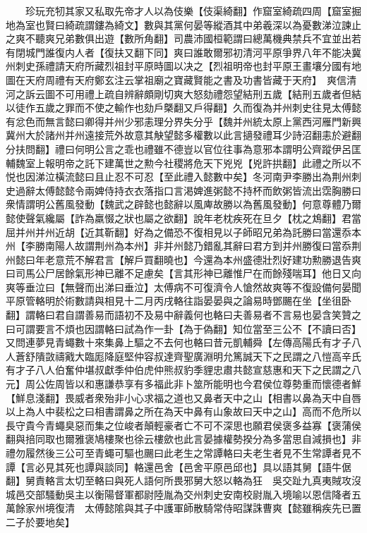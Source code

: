 　　珍玩充牣其家又私取先帝才人以為伎樂【伎渠綺翻】作窟室綺疏四周【窟室掘地為室也賢曰綺疏謂鏤為綺文】數與其黨何晏等縱酒其中弟羲深以為憂數涕泣諫止之爽不聽爽兄弟數俱出遊【數所角翻】司農沛國桓範謂曰總萬機典禁兵不宜並出若有閉城門誰復内人者【復扶又翻下同】爽曰誰敢爾邪初清河平原爭界八年不能决冀州刺史孫禮請天府所藏烈祖封平原時圖以决之【烈祖明帝也封平原王畫壤分國有地圖在天府周禮有天府鄭玄注云掌祖廟之寶藏賢能之書及功書皆藏于天府】　爽信清河之訴云圖不可用禮上疏自辨辭頗剛切爽大怒劾禮怨望結刑五歲【結刑五歲者但結以徒作五歲之罪而不使之輸作也劾戶槩翻又戶得翻】久而復為并州刺史往見太傅懿有忿色而無言懿曰卿得并州少邪恚理分界失分乎【魏并州統太原上黨西河雁門新興冀州大於諸州并州遠接荒外故意其觖望懿多權數以此言擿發禮耳少詩沼翻恚於避翻分扶問翻】禮曰何明公言之乖也禮雖不德豈以官位往事為意邪本謂明公齊蹤伊呂匡輔魏室上報明帝之託下建萬世之勲今社稷將危天下兇兇【兇許拱翻】此禮之所以不悦也因涕泣橫流懿曰且止忍不可忍【至此禮入懿數中矣】冬河南尹李勝出為荆州刺史過辭太傅懿懿令兩婢侍持衣衣落指口言渇婢進粥懿不持杯而飲粥皆流出霑胸勝曰衆情謂明公舊風發動【魏武之辟懿也懿辭以風庳故勝以為舊風發動】何意尊體乃爾懿使聲氣纔屬【詐為羸惙之狀也屬之欲翻】說年老枕疾死在旦夕【枕之鴆翻】君當屈并州并州近胡【近其靳翻】好為之備恐不復相見以子師昭兄弟為託勝曰當還忝本州【李勝南陽人故謂荆州為本州】非并州懿乃錯亂其辭曰君方到并州勝復曰當忝荆州懿曰年老意荒不解君言【解戶買翻曉也】今還為本州盛德壯烈好建功勲勝退告爽曰司馬公尸居餘氣形神已離不足慮矣【言其形神已離惟尸在而餘殘喘耳】他日又向爽等垂泣曰【無聲而出涕曰垂泣】太傅病不可復濟令人愴然故爽等不復設備何晏聞平原管輅明於術數請與相見十二月丙戌輅往詣晏晏與之論易時鄧颺在坐【坐徂卧翻】謂輅曰君自謂善易而語初不及易中辭義何也輅曰夫善易者不言易也晏含笑贊之曰可謂要言不煩也因謂輅曰試為作一卦【為于偽翻】知位當至三公不【不讀曰否】又問連夢見青蠅數十來集鼻上驅之不去何也輅曰昔元凱輔舜【左傳高陽氏有才子八人蒼舒隤敳禱戭大臨厖降庭堅仲容叔達齊聖廣淵明允篤誠天下之民謂之八愷高辛氏有才子八人伯奮仲堪叔獻季仲伯虎仲熊叔豹季貍忠肅共懿宣慈惠和天下之民謂之八元】周公佐周皆以和惠謙恭享有多福此非卜筮所能明也今君侯位尊勢重而懷德者鮮【鮮息淺翻】畏威者衆殆非小心求福之道也又鼻者天中之山【相書以鼻為天中自唇以上為人中裴松之曰相書謂鼻之所在為天中鼻有山象故曰天中之山】高而不危所以長守貴今青蠅臭惡而集之位峻者顛輕豪者亡不可不深思也願君侯褒多益寡【褒蒲侯翻與掊同取也爾雅褒鳩樓聚也徐云樓歛也此言晏據權勢揆分為多當思自減損也】非禮勿履然後三公可至青蠅可驅也颺曰此老生之常譚輅曰夫老生者見不生常譚者見不譚【言必見其死也譚與談同】輅還邑舍【邑舍平原邑邱也】具以語其舅【語牛倨翻】舅責輅言太切至輅曰與死人語何所畏邪舅大怒以輅為狂　吳交趾九真夷賊攻沒城邑交部騷動吳主以衡陽督軍都尉陸胤為交州刺史安南校尉胤入境喻以恩信降者五萬餘家州境復清　太傅懿隂與其子中護軍師散騎常侍昭謀誅曹爽【懿雖稱疾先已置二子於要地矣】

